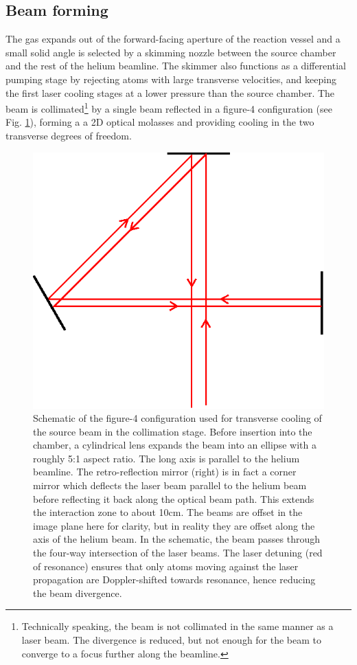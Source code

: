 \subsection*{Beam forming}

	The gas expands out of the forward-facing aperture of the reaction vessel and a small solid angle is selected by a skimming nozzle between the source chamber and the rest of the helium beamline.
	The skimmer also functions as a differential pumping stage by rejecting atoms with large transverse velocities, and keeping the first laser cooling stages at a lower pressure than the source chamber.
	The beam is collimated\footnote{Technically speaking, the beam is not collimated in the same manner as a laser beam.
	The divergence is reduced, but not enough for the beam to converge to a focus further along the beamline.} by a single beam reflected in a figure-4 configuration (see Fig. \ref{fig:figure_4}), forming a a 2D optical molasses\cite{Lett81,Rooijakkers96} and providing cooling in the two transverse degrees of freedom.
	\begin{figure}
		\centering
		\includegraphics{fig/apparatus/figure_4_beams}
		\caption{Schematic of the figure-4 configuration used for transverse cooling of the source beam in the collimation stage. Before insertion into the chamber, a cylindrical lens expands the beam into an ellipse with a roughly 5:1 aspect ratio. The long axis is parallel to the helium beamline. The retro-reflection mirror (right) is in fact a corner mirror which deflects the laser beam parallel to the helium beam before reflecting it back along the optical beam path.  
		This extends the interaction zone to about 10cm. 
		The beams are offset in the image plane here for clarity, but in reality they are offset along the axis of the helium beam.
		In the schematic, the beam passes through the four-way intersection of the laser beams. 
		The laser detuning (red of resonance) ensures that only atoms moving against the laser propagation are Doppler-shifted towards resonance, hence reducing the beam divergence.}
		\label{fig:figure_4}
	\end{figure}


